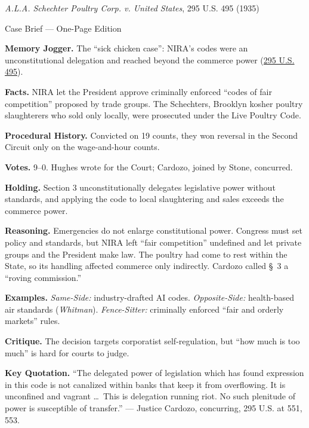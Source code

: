 \documentclass[12pt]{article}
\begin{document}
\begin{center}
{\Large \textit{A.L.A. Schechter Poultry Corp. v. United States}, 295 U.S. 495 (1935)\par}
\vspace{0.3em}
{\normalsize Case Brief --- One-Page Edition\par}
\end{center}

\textbf{Memory Jogger.} The ``sick chicken case'': NIRA's codes were an unconstitutional delegation and reached beyond the commerce power (\href{https://supreme.justia.com/cases/federal/us/295/495/}{295 U.S. 495}).

\textbf{Facts.} NIRA let the President approve criminally enforced ``codes of fair competition'' proposed by trade groups. The Schechters, Brooklyn kosher poultry slaughterers who sold only locally, were prosecuted under the Live Poultry Code.

\textbf{Procedural History.} Convicted on 19 counts, they won reversal in the Second Circuit only on the wage-and-hour counts.

\textbf{Votes.} 9--0. Hughes wrote for the Court; Cardozo, joined by Stone, concurred.

\textbf{Holding.} Section 3 unconstitutionally delegates legislative power without standards, and applying the code to local slaughtering and sales exceeds the commerce power.

\textbf{Reasoning.} Emergencies do not enlarge constitutional power. Congress must set policy and standards, but NIRA left ``fair competition'' undefined and let private groups and the President make law. The poultry had come to rest within the State, so its handling affected commerce only indirectly. Cardozo called \S~3 a ``roving commission.''

\textbf{Examples.} \emph{Same-Side:} industry-drafted AI codes. \emph{Opposite-Side:} health-based air standards (\textit{Whitman}). \emph{Fence-Sitter:} criminally enforced ``fair and orderly markets'' rules.

\textbf{Critique.} The decision targets corporatist self-regulation, but ``how much is too much'' is hard for courts to judge.

\textbf{Key Quotation.} ``The delegated power of legislation which has found expression in this code is not canalized within banks that keep it from overflowing. It is unconfined and vagrant \dots\ This is delegation running riot. No such plenitude of power is susceptible of transfer.'' --- Justice Cardozo, concurring, 295 U.S. at 551, 553.
\end{document}
